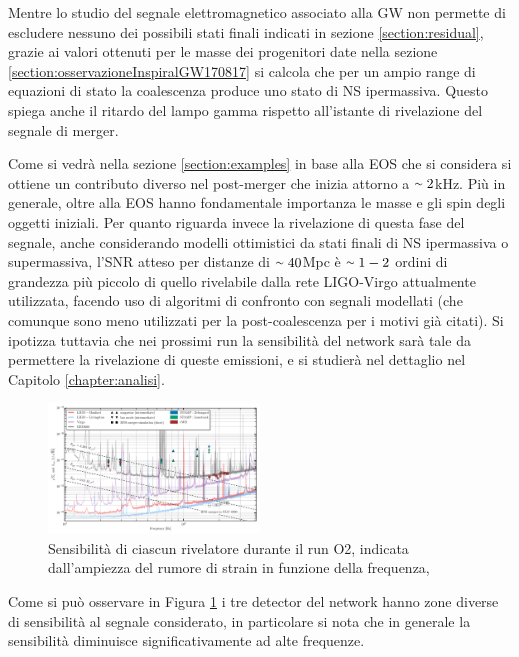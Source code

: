Mentre lo studio del segnale elettromagnetico associato alla GW non permette di escludere nessuno dei possibili stati finali indicati in sezione \ref{section:residual}, grazie ai valori ottenuti per le masse dei progenitori date nella sezione \ref{section:osservazioneInspiralGW170817} si calcola che per un ampio range di equazioni di stato la coalescenza produce uno stato di NS ipermassiva. Questo spiega anche il ritardo del lampo gamma rispetto all'istante di rivelazione del segnale di merger. 

Come si vedrà nella sezione \ref{section:examples} in base alla EOS che si considera si ottiene un contributo diverso nel post-merger che inizia attorno a $\smallsim2$kHz. Più in generale, oltre alla EOS hanno fondamentale importanza le masse e gli spin degli oggetti iniziali. 
Per quanto riguarda invece la rivelazione di questa fase del segnale, anche considerando modelli ottimistici da stati finali di NS ipermassiva o supermassiva, l'SNR atteso per distanze di $\smallsim40$Mpc è $\smallsim1-2$ ordini di grandezza più piccolo di quello rivelabile dalla rete LIGO-Virgo attualmente utilizzata, facendo uso di algoritmi di confronto con segnali modellati (che comunque sono meno utilizzati per la post-coalescenza per i motivi già citati).
Si ipotizza tuttavia che nei prossimi run la sensibilità del network sarà tale da permettere la rivelazione di queste emissioni\cite{Abbott_2017b}, e si studierà nel dettaglio nel Capitolo \ref{chapter:analisi}.

\begin{figure}
	\vspace{-20pt}
	\begin{center}
		\includegraphics[width=0.5\textwidth]{figures/Capitolo_2/GW170817_spectral_limits.pdf}
	\end{center}
	\vspace{-5pt}
	\caption{Sensibilità di ciascun rivelatore durante il run O2, indicata dall'ampiezza del rumore di strain in funzione della frequenza, \cite{Abbott_2017b}}
	\label{fig:NoiseFrequenze}
	\vspace{-10pt}
\end{figure}
Come si può osservare in Figura \ref{fig:NoiseFrequenze} i tre detector del network hanno zone diverse di sensibilità al segnale considerato, in particolare si nota che in generale la sensibilità diminuisce significativamente ad alte frequenze. 

